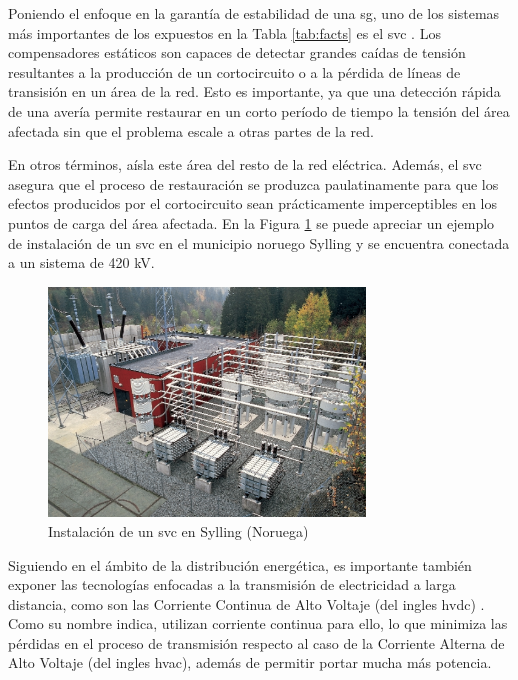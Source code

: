 Poniendo el enfoque en la garantía de estabilidad de una \gls{sg}, uno de los sistemas más importantes de los expuestos en la Tabla \ref{tab:facts} es el \gls{svc} \cite{facts}. Los compensadores estáticos son capaces de detectar grandes caídas de tensión resultantes a la producción de un cortocircuito o a la pérdida de líneas de transisión en un área de la red. Esto es importante, ya que una detección rápida de una avería permite restaurar en un corto período de tiempo la tensión del área afectada sin que el problema escale a otras partes de la red. 

\vspace{3mm}

En otros términos, aísla este área del resto de la red eléctrica. Además, el \gls{svc} asegura que el proceso de restauración se produzca paulatinamente para que los efectos producidos por el cortocircuito sean prácticamente imperceptibles en los puntos de carga del área afectada. En la Figura \ref{fig:svc} se puede apreciar un ejemplo de instalación de un \gls{svc} en el municipio noruego Sylling y se encuentra conectada a un sistema de 420 kV.

\vspace{3mm}

\begin{figure}[h!]
  \centering
  \includegraphics[width=0.75\textwidth]{img/teoria/svc.png}
  \caption{Instalación de un \acrshort{svc} en Sylling (Noruega) \cite{facts}}
  \label{fig:svc}
\end{figure}

Siguiendo en el ámbito de la distribución energética, es importante también exponer las tecnologías enfocadas a la transmisión de electricidad a larga distancia, como son las Corriente Continua de Alto Voltaje (del ingles \gls{hvdc}) \cite{hvdc}. Como su nombre indica, utilizan corriente continua para ello, lo que minimiza las pérdidas en el proceso de transmisión respecto al caso de la Corriente Alterna de Alto Voltaje (del ingles \gls{hvac}), además de permitir portar mucha más potencia. 

